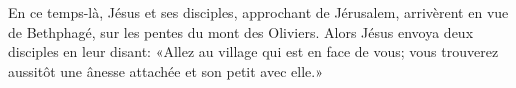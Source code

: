 En ce temps-là, Jésus et ses disciples,
	approchant de Jérusalem, arrivèrent en vue de Bethphagé,
	sur les pentes du mont des Oliviers.
Alors Jésus envoya deux disciples en leur disant:
	«Allez au village qui est en face de vous;
	vous trouverez aussitôt une ânesse attachée et son petit avec elle.»
